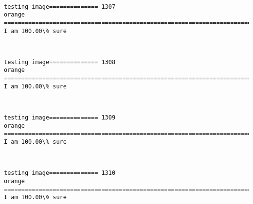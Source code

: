 \documentclass[11pt]{article}
\begin{document}
    \begin{center}
    \end{center}
    { \hspace*{\fill} \\}
    
    \begin{Verbatim}[commandchars=\\\{\}]
testing image============== 1307
orange
============================================================================
I am 100.00\% sure

    \end{Verbatim}

    \begin{center}
    \end{center}
    { \hspace*{\fill} \\}
    
    \begin{Verbatim}[commandchars=\\\{\}]
testing image============== 1308
orange
============================================================================
I am 100.00\% sure

    \end{Verbatim}

    \begin{center}
    \end{center}
    { \hspace*{\fill} \\}
    
    \begin{Verbatim}[commandchars=\\\{\}]
testing image============== 1309
orange
============================================================================
I am 100.00\% sure

    \end{Verbatim}

    \begin{center}
    \end{center}
    { \hspace*{\fill} \\}
    
    \begin{Verbatim}[commandchars=\\\{\}]
testing image============== 1310
orange
============================================================================
I am 100.00\% sure

    \end{Verbatim}
\end{document}
